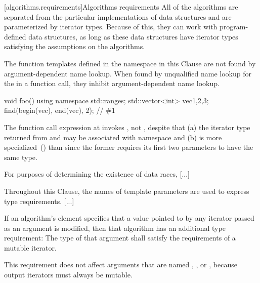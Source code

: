 [algorithms.requirements]{Algorithms requirements}
\pnum
All of the algorithms are separated from the particular implementations of data structures and are
parameterized by iterator types.
Because of this, they can work with program-defined data structures, as long
as these data structures have iterator types satisfying the assumptions on the algorithms.

\begin{addedblock}
{\color{newclr}
\pnum
The function templates defined in the  namespace
in this Clause are not found by argument-dependent
name lookup. When found by
unqualified name lookup for the
 in a function call, they
inhibit argument-dependent name lookup.

\begin{example}
\begin{codeblock}
void foo() {
    using namespace std::ranges;
    std::vector<int> vec{1,2,3};
    find(begin(vec), end(vec), 2); // \#1
}
\end{codeblock}
The function call expression at  invokes ,
not , despite that (a) the iterator type returned from 
and  may be associated with namespace  and (b)
 is more specialized~() than
 since the former requires its first two parameters to
have the same type.
\end{example}
} %
\end{addedblock}

\pnum
For purposes of determining the existence of data races, [...]

\pnum
Throughout this Clause, 
the names of template parameters are used to express type requirements. [...]

\pnum
If an algorithm's
\effects
element specifies that a value pointed to by any iterator passed
as an argument is modified, then that algorithm has an additional
type requirement:
The type of that argument shall satisfy the requirements
of a mutable iterator.
\begin{note}
This requirement does not affect arguments that are named
,
,
or
,
because output iterators must always be mutable.
\end{note}

